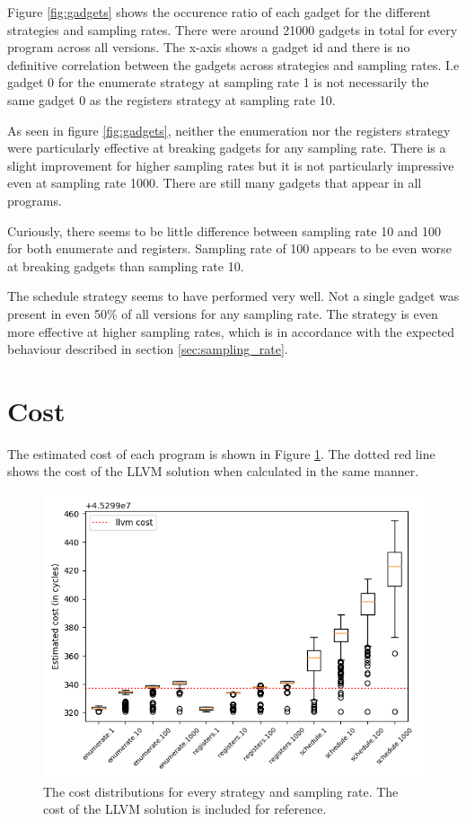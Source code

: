Figure \ref{fig:gadgets} shows the occurence ratio of each gadget for the different
strategies and sampling rates. There were around 21000 gadgets in total for every program
across all versions. The x-axis shows a gadget id and there is no definitive correlation
between the gadgets across strategies and sampling rates. I.e gadget 0 for the enumerate
strategy at sampling rate 1 is not necessarily the same gadget 0 as the registers strategy
at sampling rate 10.

As seen in figure \ref{fig:gadgets}, neither the enumeration nor the registers strategy
were particularly effective at breaking gadgets for any sampling rate. There is a slight
improvement for higher sampling rates but it is not particularly impressive even at
sampling rate 1000. There are still many gadgets that appear in all programs.

Curiously, there seems to be little difference between sampling rate 10 and 100 for both
enumerate and registers. Sampling rate of 100 appears to be even worse at breaking gadgets
than sampling rate 10.

The schedule strategy seems to have performed very well. Not a single gadget was present
in even 50\% of all versions for any sampling rate. The strategy is even more effective at
higher sampling rates, which is in accordance with the expected behaviour described in
section \ref{sec:sampling_rate}.

\section{Cost}

The estimated cost of each program is shown in Figure \ref{fig:cost}. The dotted red line
shows the cost of the LLVM solution when calculated in the same manner.

\begin{figure}[h]
	\centering
	\includegraphics[width=\textwidth,height=0.5\textheight]{results/figures/cost}
	\caption{The cost distributions for every strategy and sampling rate. The cost of the LLVM solution is included for reference.}
	\label{fig:cost}
\end{figure}

